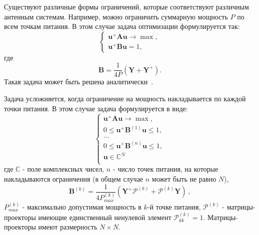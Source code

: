 Существуют различные формы ограничений, которые соответствуют различным антенным системам. Например, можно ограничить суммарную мощность $P$ по всем точкам питания. В этом случае задача оптимизации формулируется так:
%
     \begin{equation}
        \begin{cases}
           \textbf{u}^{+}\textbf{Au} \rightarrow \max,\\
           \textbf{u}^{+}\textbf{Bu} = 1,
         \end{cases}
         \label{eq:task1}
    \end{equation}
%
где
%
    \begin{equation}
        \textbf{B} = \frac{1}{4P}(\textbf{Y} + \textbf{Y}^{+}).
        \label{eq:B}
    \end{equation}
%
Такая задача может быть решена аналитически~\cite{yurkov:farkv}.

Задача усложняется, когда ограничение на мощность накладывается по каждой точки питания. В этом случае задача формулируется в виде:
%
    \begin{equation}
        \begin{cases}
           \textbf{u}^{+}\textbf{Au} \rightarrow \max,\\
           0 \leq \textbf{u}^{+}\textbf{B}^{(1)}\textbf{u} \leq 1, \\
           ...\\
           0 \leq \textbf{u}^{+}\textbf{B}^{(n)}\textbf{u} \leq 1,\\
           \textbf{u} \in \mathbb{C}^N\\
         \end{cases}
         \label{eq:task2}
    \end{equation}
%
где $\mathbb{C}$ - поле комплексных чисел, $n$ - число точек питания, на которые накладываются ограничения (в общем случае $n$ может быть не равно $N$),
%
    \begin{equation}
        \textbf{B}^{(k)} = \frac{1}{4P_{max}^{(k)}}(\textbf{Y}^{+}\mathcal{P}^{(k)} + \mathcal{P}^{(k)}\textbf{Y}) \, ,
    \end{equation}
%
$P_{max}^{(k)}$ - максимально допустимая мощность в $k$-й точке питания, $\mathcal{P}^{(k)}$ - матрицы-проекторы имеющие единственный ненулевой элемент $\mathcal{P}^{(k)}_{kk}=1$. Матрицы-проекторы имеют размерность $N \times N$.

